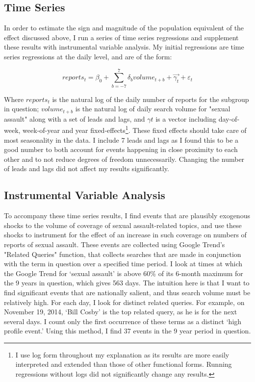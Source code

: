 \documentclass[AER,draftmode]{AEA}
\begin{document}
\subsection{Time Series}

In order to estimate the sign and magnitude of the population equivalent of the effect discussed above, I run a series of time series regressions and supplement these results with instrumental variable analysis. My initial regressions are time series regressions at the daily level, and are of the form: 

$$ 
reports_{t} = \beta_{0} + \sum_{b=-7}^{7} \delta_{b} volume_{t+b} + \vec{\gamma_{t}} + \varepsilon_{t}
$$

Where $reports_{t}$ is the natural log of the daily number of reports for the subgroup in question; $volume_{t+b}$ is the natural log of daily search volume for "sexual assault" along with a set of leads and lags, and $\gamma{t}$ is a vector including day-of-week, week-of-year and year fixed-effects\footnote{I use log form throughout my explanation as its results are more easily interpreted and extended than those of other functional forms. Running regressions without logs did not significantly change any results.}. These fixed effects should take care of most seasonality in the data. I include 7 leads and lags as I found this to be a good number to both account for events happening in close proximity to each other and to not reduce degrees of freedom unnecessarily. Changing the number of leads and lags did not affect my results significantly.

\subsection{Instrumental Variable Analysis}

To accompany these time series results, I find events that are plausibly exogenous shocks to the volume of coverage of sexual assault-related topics, and use these shocks to instrument for the effect of an increase in such coverage on numbers of reports of sexual assault. These events are collected using Google Trend's "Related Queries" function, that collects searches that are made in conjunction with the term in question over a specified time period. I look at times at which the Google Trend for `sexual assault' is above 60\% of its 6-month maximum for the 9 years in question, which gives 563 days. The intuition here is that I want to find significant events that are nationally salient, and thus search volume must be relatively high. For each day, I look for distinct related queries. For example, on November 19, 2014, `Bill Cosby' is the top related query, as he is for the next several days. I count only the first occurrence of these terms as a distinct `high profile event.' Using this method, I find 37 events in the 9 year period in question. 
\end{document}
